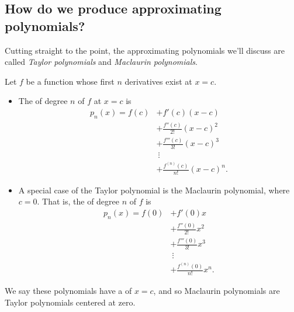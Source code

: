 \documentclass{ximera}
\begin{document}
\subsection{How do we produce approximating polynomials?}

Cutting straight to the point, the approximating polynomials we'll
discuss are called \textit{Taylor polynomials} and \textit{Maclaurin
  polynomials}.

\begin{definition}
  Let $f$ be a function whose first $n$ derivatives exist at $x=c$.
  \begin{itemize}
  \item The  of degree $n$ of $f$ at $x=c$ is
    \begin{align*}
      p_n(x) = f(c) &+ f'(c)(x-c) \\
      &+ \frac{f''(c)}{2!}(x-c)^2 \\
      &+\frac{f'''(c)}{3!}(x-c)^3 \\
      &\ \vdots \\
      &+\frac{f^{(n)}(c)}{n!}(x-c)^n.
    \end{align*}
  \item A special case of the Taylor polynomial is the Maclaurin
    polynomial, where $c=0$. That is, the 
    of degree $n$ of $f$ is
    \begin{align*}
      p_n(x) = f(0) &+ f'(0)x \\
      &+\frac{f''(0)}{2!}x^2\\
      &+\frac{f'''(0)}{3!}x^3\\
      &\ \vdots\\
      &+\frac{f^{(n)}(0)}{n!}x^n.
    \end{align*}
  \end{itemize}
  We say these polynomials have a  of $x=c$, and so
  Maclaurin polynomials are Taylor polynomials centered at
  zero.
\end{definition}
\end{document}
